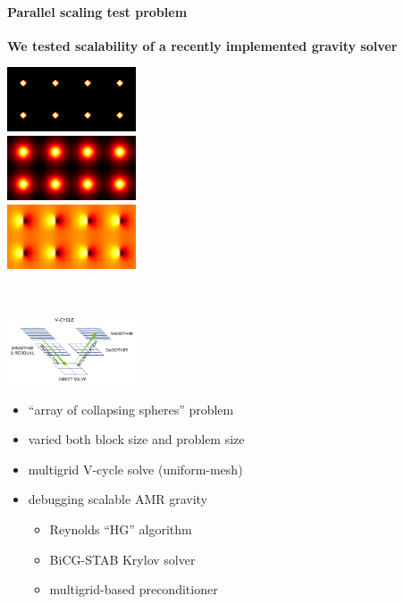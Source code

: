 \begin{frame}[fragile,label=ss-recent-gravity] 
\secframetitle{\ssRecentGravity}
\framesubtitle{Parallel scaling test problem}

\textbf{We tested scalability of a recently implemented gravity solver}
\begin{minipage}{1.5in}
  \vspace{0.2in}
  \includegraphics[width=1.5in]{de.png} \ \\
  \includegraphics[width=1.5in]{po.png} \ \\
  \includegraphics[width=1.5in]{axz.png}
\end{minipage} \
\begin{minipage}{2.75in}
\centerline{\includegraphics[width=1.5in]{hpgmg_v_cycle.png}}
  \begin{itemize}
  \item ``array of collapsing spheres'' problem
  \item varied both block size and problem size
  \item multigrid V-cycle solve (uniform-mesh)
  \item debugging scalable AMR gravity
    \begin{itemize}
      \item Reynolds ``HG'' algorithm
    \item BiCG-STAB Krylov solver
    \item multigrid-based preconditioner
    \end{itemize}
  \end{itemize}
\end{minipage}
\end{frame}
